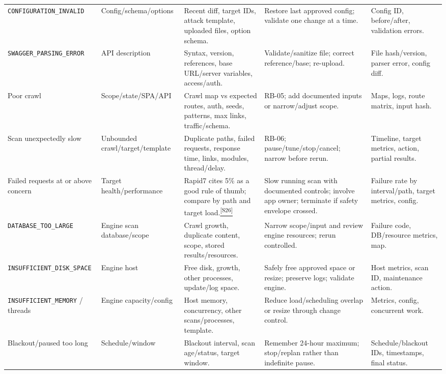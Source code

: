 \documentclass[11pt,letterpaper,oneside]{scrreprt}
\newcommand{\src}[1]{\hyperref[src:#1]{\textsuperscript{\color{R7Orange}[#1]}}}
\newcommand{\code}[1]{\texttt{#1}}
\begin{document}
\begin{landscape}
\begin{longtable}{@{}P{1.35in}P{1.35in}P{1.75in}P{2.10in}P{1.75in}@{}}
\code{CONFIGURATION\_\allowbreak INVALID} & Config/schema/options & Recent diff, target IDs, attack template, uploaded files, option schema. & Restore last approved config; validate one change at a time. & Config ID, before/after, validation errors.\\
\code{SWAGGER\_\allowbreak PARSING\_\allowbreak ERROR} & API description & Syntax, version, references, base URL/server variables, access/auth. & Validate/sanitize file; correct reference/base; re-upload. & File hash/version, parser error, config diff.\\
Poor crawl & Scope/state/SPA/API & Crawl map vs expected routes, auth, seeds, patterns, max links, traffic/schema. & RB-05; add documented inputs or narrow/adjust scope. & Maps, logs, route matrix, input hash.\\
Scan unexpectedly slow & Unbounded crawl/target/template & Duplicate paths, failed requests, response time, links, modules, thread/delay. & RB-06; pause/tune/stop/cancel; narrow before rerun. & Timeline, target metrics, action, partial results.\\
Failed requests at or above concern & Target health/performance & Rapid7 cites 5\% as a good rule of thumb; compare by path and target load.\src{S26} & Slow running scan with documented controls; involve app owner; terminate if safety envelope crossed. & Failure rate by interval/path, target metrics, config.\\
\code{DATABASE\_\allowbreak TOO\_\allowbreak LARGE} & Engine scan database/scope & Crawl growth, duplicate content, scope, stored results/resources. & Narrow scope/input and review engine resources; rerun controlled. & Failure code, DB/resource metrics, map.\\
\code{INSUFFICIENT\_\allowbreak DISK\_\allowbreak SPACE} & Engine host & Free disk, growth, other processes, update/log space. & Safely free approved space or resize; preserve logs; validate engine. & Host metrics, scan ID, maintenance action.\\
\code{INSUFFICIENT\_\allowbreak MEMORY} / threads & Engine capacity/config & Host memory, concurrency, other scans/processes, template. & Reduce load/scheduling overlap or resize through change control. & Metrics, config, concurrent work.\\
Blackout/paused too long & Schedule/window & Blackout interval, scan age/status, target window. & Remember 24-hour maximum; stop/replan rather than indefinite pause. & Schedule/blackout IDs, timestamps, final status.\\

\end{longtable}
\end{landscape}
\end{document}
